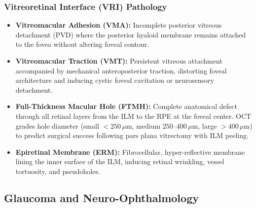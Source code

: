 \documentclass[11pt,a4paper]{article}
\begin{document}
\subsubsection{Vitreoretinal Interface (VRI) Pathology}
\begin{itemize}[leftmargin=*]
    \item \textbf{Vitreomacular Adhesion (VMA):} Incomplete posterior vitreous detachment (PVD) where the posterior hyaloid membrane remains attached to the fovea without altering foveal contour.
    \item \textbf{Vitreomacular Traction (VMT):} Persistent vitreous attachment accompanied by mechanical anteroposterior traction, distorting foveal architecture and inducing cystic foveal cavitation or neurosensory detachment.
    \item \textbf{Full-Thickness Macular Hole (FTMH):} Complete anatomical defect through all retinal layers from the ILM to the RPE at the foveal center. OCT grades hole diameter (small $< 250\,\mu\text{m}$, medium $250\text{--}400\,\mu\text{m}$, large $> 400\,\mu\text{m}$) to predict surgical success following pars plana vitrectomy with ILM peeling.
    \item \textbf{Epiretinal Membrane (ERM):} Fibrocellular, hyper-reflective membrane lining the inner surface of the ILM, inducing retinal wrinkling, vessel tortuosity, and pseudoholes.
\end{itemize}

\subsection{Glaucoma and Neuro-Ophthalmology}
\end{document}
